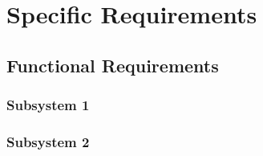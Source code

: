 \chapter{Specific Requirements}

\section{Functional Requirements}
\subsection{Subsystem 1}


\subsection{Subsystem 2}
